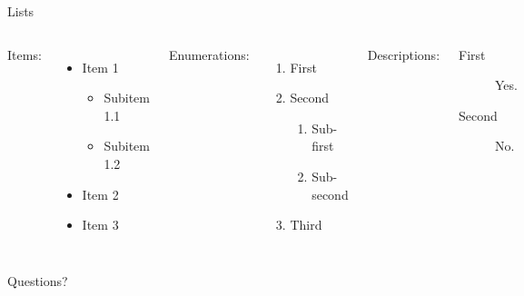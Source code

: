\documentclass{beamer}
\begin{document}

\begin{frame}{Lists}
    \begin{columns}[T, onlytextwidth] %
            Items:
            \begin{itemize}
                \item Item 1
                \begin{itemize}
                    \item Subitem 1.1
                    \item Subitem 1.2
                \end{itemize}
                \item Item 2
                \item Item 3
            \end{itemize}

            Enumerations:
            \begin{enumerate}
                \item First
                \item Second
                \begin{enumerate}
                    \item Sub-first
                    \item Sub-second
                \end{enumerate}
                \item Third
            \end{enumerate}

            Descriptions:
            \begin{description}
                \item[First] Yes.
                \item[Second] No.
            \end{description}
    \end{columns}
\end{frame}


\begin{frame}[focus]
    Questions?
\end{frame}

\end{document}
